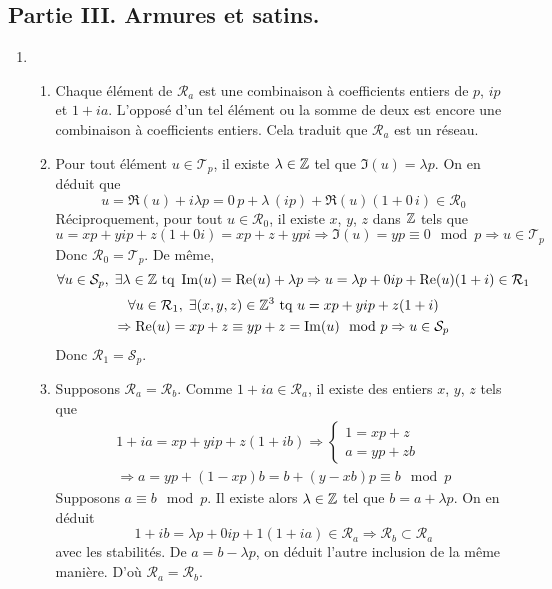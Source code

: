 \subsection*{Partie III. Armures et satins.}
\begin{enumerate}
\item 
\begin{enumerate}
  \item Chaque élément de $\mathcal{R}_a$ est une combinaison à coefficients entiers de $p$, $ip$ et $1+ia$. L'opposé d'un tel élément ou la somme de deux est encore une combinaison à coefficients entiers. Cela traduit que $\mathcal{R}_a$ est un réseau.
  \item Pour tout élément $u\in \mathcal{T}_p$, il existe $\lambda\in \mathbb{Z}$ tel que $\Im(u) = \lambda p$. On en déduit que 
\begin{displaymath}
  u = \Re(u) + i\lambda p = 0\, p + \lambda\,(ip) + \Re(u)(1 + 0\, i) \in \mathcal{R}_0
\end{displaymath}
Réciproquement, pour tout $u\in \mathcal{R}_0$, il existe $x$, $y$, $z$ dans $\mathbb{Z}$ tels que 
\begin{displaymath}
  u = xp + yip + z(1+0i) = xp+z + ypi\Rightarrow \Im(u) = yp \equiv 0 \mod p \Rightarrow u\in \mathcal{T}_p
\end{displaymath}
Donc $\mathcal{R}_0 = \mathcal{T}_p$. De même,
\begin{displaymath}
\forall u\in \mathcal{S}_p,\; \exists \lambda \in \mathbb{Z} \text{ tq }
\operatorname{Im}(u) = \operatorname{Re}(u) + \lambda p
\Rightarrow u = \lambda p + 0 ip + \operatorname{Re}(u)(1+i) \in \mathcal{R}_1
\end{displaymath}
\begin{multline*}
\forall u \in \mathcal{R}_1,\; \exists (x,y,z)\in \mathbb{Z}^3 \text{ tq }
u = xp+yip+z(1+i)  \\
\Rightarrow \operatorname{Re}(u)=xp + z \equiv yp + z = \operatorname{Im}(u) \mod p
\Rightarrow u\in \mathcal{S}_p 
\end{multline*}
Donc $\mathcal{R}_1 = \mathcal{S}_p$.

  \item Supposons $\mathcal{R}_a = \mathcal{R}_b$. Comme $1+ia\in \mathcal{R}_a$, il existe des entiers $x$, $y$, $z$ tels que 
\begin{multline*}
  1+ia = xp + yip + z(1+ib) \Rightarrow 
\left\lbrace  
\begin{aligned}
  1 = xp +z \\ a = yp + zb
\end{aligned}
\right. \\
\Rightarrow a = yp + (1-xp)b = b + (y-xb)p \equiv b \mod p
\end{multline*}
Supposons $a\equiv b \mod p$. Il existe alors $\lambda\in \mathbb{Z}$ tel que $b = a + \lambda p$. On en déduit
\begin{displaymath}
1+ ib = \lambda p + 0 ip + 1(1+ia) \in \mathcal{R}_a \Rightarrow \mathcal{R}_b \subset \mathcal{R}_a  
\end{displaymath}
avec les stabilités. De $a = b - \lambda p$, on déduit l'autre inclusion de la même manière. D'où $\mathcal{R}_a = \mathcal{R}_b$.
\end{enumerate}


\end{enumerate}
